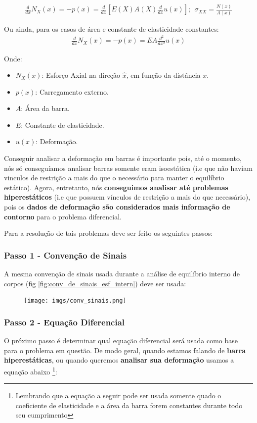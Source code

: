 \documentclass{article}
\begin{document}
\begin{align*}
    \frac{d}{dx}N_X(x) = -p(x) = \frac{d}{dx}\left[E(X) A(X) \frac{d}{dx}u(x)\right]; \ \ \sigma_{XX} = \frac{N(x)}{A(x)}
\end{align*}

Ou ainda, para os casos de área e constante de elasticidade constantes:
\begin{align*}
    \frac{d}{dx}N_X(x) = -p(x) = EA \frac{d^2}{dx^2}u(x)
\end{align*}

Onde:
\begin{itemize}
    \item $N_X(x)$: Esforço Axial na direção $\hat x$, em função da distância $x$.
    \item $p(x)$: Carregamento externo.
    \item $A$: Área da barra.
    \item $E$: Constante de elasticidade.
    \item $u(x)$: Deformação.
\end{itemize}


Conseguir analisar a deformação em barras é importante pois, até o momento, nós só conseguíamos analisar barras somente eram isoestática (i.e que não haviam vinculos de restrição a mais do que o necessário para manter o equilíbrio estático). Agora, entretanto, nós \textbf{conseguimos analisar até problemas hiperestáticos} (i.e que possuem vínculos de restrição a mais do que necessário), pois os \textbf{dados de deformação são considerados mais informação de contorno} para o problema diferencial.

Para a resolução de tais problemas deve ser feito os seguintes passos:

\newpage
\subsubsection*{Passo 1 - Convenção de Sinais}
A mesma convenção de sinais usada durante a análise de equilíbrio interno de corpos (fig \ref{fig:conv_de_sinais_esf_intern}) deve ser usada:
\begin{figure}[h]
    \centering
    \texttt{[image: imgs/conv\_sinais.png]}
\end{figure}

\subsubsection*{Passo 2 - Equação Diferencial}
O próximo passo é determinar qual equação diferencial será usada como base para o problema em questão. De modo geral, quando estamos falando de \textbf{barra hiperestáticas}, ou quando queremos \textbf{analisar sua deformação} usamos a equação abaixo \footnote{Lembrando que a equação a seguir pode ser usada somente quado o coeficiente de elasticidade e a área da barra forem constantes durante todo seu cumprimento}:
\end{document}
